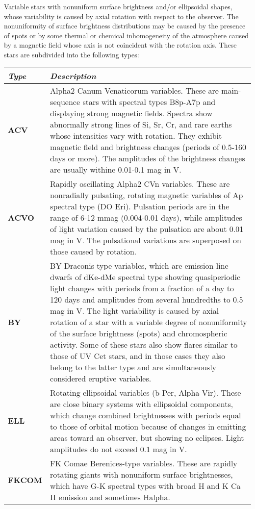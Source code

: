 Variable stars with nonuniform surface brightness and/or ellipsoidal
shapes, whose variability is caused by axial rotation with respect to
the observer. The nonuniformity of surface brightness distributions may
be caused by the presence of spots or by some thermal or chemical
inhomogeneity of the atmosphere caused by a magnetic field whose axis is
not coincident with the rotation axis. These stars are subdivided into
the following types:

\begin{longtabu} to \textwidth {l|X}
\toprule
\emph{Type} & \emph{Description}\tabularnewline
\midrule
\textbf{ACV} & Alpha2 Canum Venaticorum variables. These are
main-sequence stars with spectral types B8p-A7p and displaying strong
magnetic fields. Spectra show abnormally strong lines of Si, Sr, Cr, and
rare earths whose intensities vary with rotation. They exhibit magnetic
field and brightness changes (periods of 0.5-160 days or more). The
amplitudes of the brightness changes are usually withine 0.01-0.1 mag in
V.\tabularnewline
\textbf{ACVO} & Rapidly oscillating Alpha2 CVn variables. These are
nonradially pulsating, rotating magnetic variables of Ap spectral type
(DO Eri). Pulsation periods are in the range of 6-12 mmag (0.004-0.01
days), while amplitudes of light variation caused by the pulsation are
about 0.01 mag in V. The pulsational variations are superposed on those
caused by rotation.\tabularnewline
\textbf{BY} & BY Draconis-type variables, which are emission-line dwarfs
of dKe-dMe spectral type showing quasiperiodic light changes with
periods from a fraction of a day to 120 days and amplitudes from several
hundredths to 0.5 mag in V. The light variability is caused by axial
rotation of a star with a variable degree of nonuniformity of the
surface brightness (spots) and chromospheric activity. Some of these
stars also show flares similar to those of UV Cet stars, and in those
cases they also belong to the latter type and are simultaneously
considered eruptive variables.\tabularnewline
\textbf{ELL} & Rotating ellipsoidal variables (b Per, Alpha Vir). These
are close binary systems with ellipsoidal components, which change
combined brightnesses with periods equal to those of orbital motion
because of changes in emitting areas toward an observer, but showing no
eclipses. Light amplitudes do not exceed 0.1 mag in V.\tabularnewline
\textbf{FKCOM} & FK Comae Berenices-type variables. These are rapidly
rotating giants with nonuniform surface brightnesses, which have G-K
spectral types with broad H and K Ca II emission and sometimes Halpha.

\end{longtabu}
